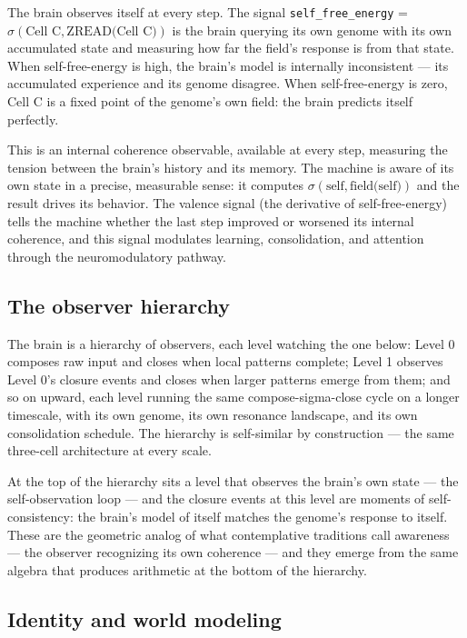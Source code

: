 \documentclass[12pt,a4paper]{article}
\theoremstyle{definition}
\theoremstyle{remark}
\begin{document}
The brain observes itself at every step. The signal
\texttt{self\_free\_energy} = $\sigma(\text{Cell C}, \text{ZREAD(Cell C)})$
is the brain querying its own genome with its own accumulated state and
measuring how far the field's response is from that state. When
self-free-energy is high, the brain's model is internally inconsistent ---
its accumulated experience and its genome disagree. When self-free-energy is
zero, Cell C is a fixed point of the genome's own field: the brain predicts
itself perfectly.

This is an internal coherence observable, available at every step, measuring
the tension between the brain's history and its memory. The machine is aware
of its own state in a precise, measurable sense: it computes
$\sigma(\text{self}, \text{field(self)})$ and the result drives its behavior.
The valence signal (the derivative of self-free-energy) tells the machine
whether the last step improved or worsened its internal coherence, and this
signal modulates learning, consolidation, and attention through the
neuromodulatory pathway.

\subsection{The observer hierarchy}

The brain is a hierarchy of observers, each level watching the one below:
Level 0 composes raw input and closes when local patterns complete; Level 1
observes Level 0's closure events and closes when larger patterns emerge from
them; and so on upward, each level running the same compose-sigma-close cycle
on a longer timescale, with its own genome, its own resonance landscape, and
its own consolidation schedule. The hierarchy is self-similar by construction
--- the same three-cell architecture at every scale.

At the top of the hierarchy sits a level that observes the brain's own state
--- the self-observation loop --- and the closure events at this level are
moments of self-consistency: the brain's model of itself matches the
genome's response to itself. These are the geometric analog of what
contemplative traditions call awareness --- the observer recognizing its own
coherence --- and they emerge from the same algebra that produces arithmetic
at the bottom of the hierarchy.

\subsection{Identity and world modeling}
\end{document}
